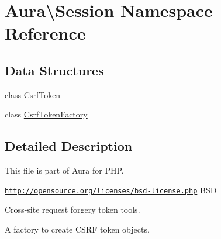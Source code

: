 \hypertarget{namespace_aura_1_1_session}{}\section{Aura\textbackslash{}Session Namespace Reference}
\label{namespace_aura_1_1_session}
\subsection*{Data Structures}
\begin{DoxyCompactItemize}
\item 
class \mbox{\hyperlink{class_aura_1_1_session_1_1_csrf_token}{Csrf\+Token}}
\item 
class \mbox{\hyperlink{class_aura_1_1_session_1_1_csrf_token_factory}{Csrf\+Token\+Factory}}
\end{DoxyCompactItemize}


\subsection{Detailed Description}
This file is part of Aura for P\+HP.

\href{http://opensource.org/licenses/bsd-license.php}{\tt http\+://opensource.\+org/licenses/bsd-\/license.\+php} B\+SD

Cross-\/site request forgery token tools.

A factory to create C\+S\+RF token objects. 